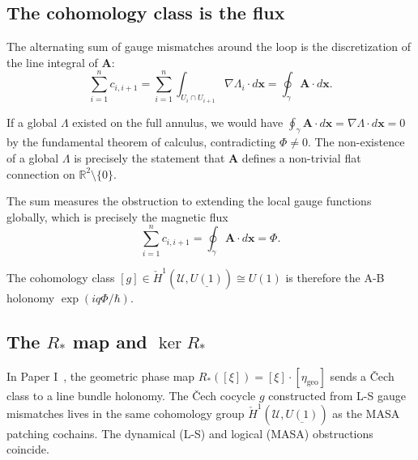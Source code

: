 \documentclass[11pt]{article}
\begin{document}
\subsection{The cohomology class is the flux}
\label{sec:flux}

The alternating sum of gauge mismatches around the loop is the discretization of
the line integral of $\mathbf{A}$:
\[
\sum_{i=1}^n c_{i,i+1}
= \sum_{i=1}^n \int_{U_i \cap U_{i+1}} \nabla\Lambda_i \cdot d\mathbf{x}
= \oint_\gamma \mathbf{A} \cdot d\mathbf{x}.
\]

If a global $\Lambda$ existed on the full annulus, we would have
$\oint_\gamma \mathbf{A} \cdot d\mathbf{x} = \nabla\Lambda \cdot d\mathbf{x} = 0$
by the fundamental theorem of calculus, contradicting $\Phi \neq 0$.
The non-existence of a global $\Lambda$ is precisely the statement that
$\mathbf{A}$ defines a non-trivial flat connection on
$\mathbb{R}^2 \setminus \{0\}$.

The sum measures the obstruction to extending the local gauge functions globally,
which is precisely the magnetic flux
\[
\sum_{i=1}^n c_{i,i+1} = \oint_\gamma \mathbf{A} \cdot d\mathbf{x} = \Phi.
\]

The cohomology class $[g] \in \check{H}^1(\mathcal{U}, \underline{U(1)}) \cong U(1)$
is therefore the A-B holonomy $\exp(iq\Phi/\hbar)$.

\subsection{The $R_*$ map and $\ker R_*$}
\label{sec:r-star}

In Paper I~\cite{PaperI}, the geometric phase map
$R_*([\xi]) = [\xi] \cdot [\eta_{\text{geo}}]$ sends a \v{C}ech class to a line
bundle holonomy. The \v{C}ech cocycle $g$ constructed from L-S gauge mismatches
lives in the same cohomology group $\check{H}^1(\mathcal{U}, \underline{U(1)})$
as the MASA patching cochains. The dynamical (L-S) and logical (MASA) obstructions
coincide.
\end{document}
